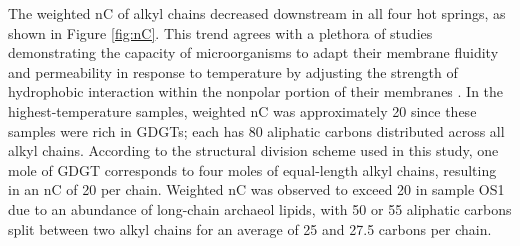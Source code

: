 

The weighted nC of alkyl chains decreased downstream in all four hot springs, as shown in Figure \ref{fig:nC}. This trend agrees with a plethora of studies demonstrating the capacity of microorganisms to adapt their membrane fluidity and permeability in response to temperature by adjusting the strength of hydrophobic interaction within the nonpolar portion of their membranes \citep[see review by][]{van2008membrane}. In the highest-temperature samples, weighted nC was approximately 20 since these samples were rich in GDGTs; each has 80 aliphatic carbons distributed across all alkyl chains. According to the structural division scheme used in this study, one mole of GDGT corresponds to four moles of equal-length alkyl chains, resulting in an nC of 20 per chain. Weighted nC was observed to exceed 20 in sample OS1 due to an abundance of long-chain archaeol lipids, with 50 or 55 aliphatic carbons split between two alkyl chains for an average of 25 and 27.5 carbons per chain.

